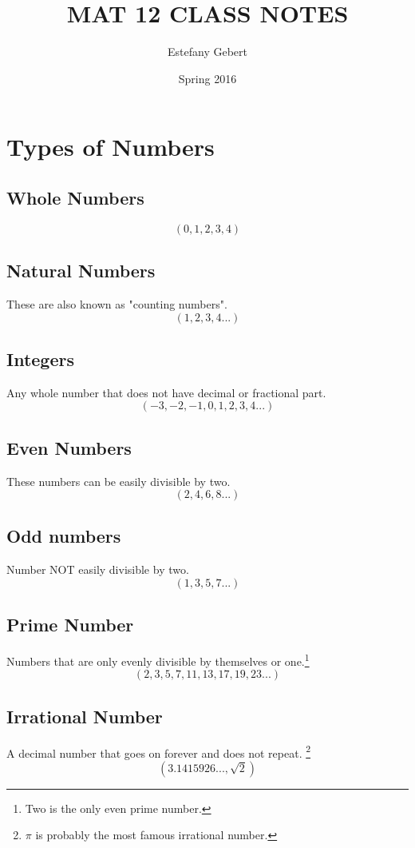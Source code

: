 \documentclass[]{article}
\title{MAT 12 CLASS NOTES}
\date{Spring 2016}
\author{Estefany Gebert}
\begin{document}
\maketitle

\tableofcontents
\pagebreak

\section{Types of Numbers}
\subsection{Whole Numbers}
$$ (0,1,2,3,4)$$

\subsection{Natural Numbers}
These are also known as "counting numbers". $$(1,2,3,4...)$$

\subsection{Integers}
Any whole number that does not have decimal or fractional part.
$$(-3,-2,-1,0,1,2,3,4...)$$

\subsection{Even Numbers}
These numbers can be easily divisible by two.
$$(2,4,6,8...)$$

\subsection{Odd numbers}
Number NOT easily divisible by two.
$$(1,3,5,7...)$$

\subsection{Prime Number}
Numbers that are only evenly divisible by themselves or one.\footnote{Two is the only even prime number.}
$$(2,3,5,7,11,13,17,19,23...)$$

\subsection{Irrational Number}
A decimal number that goes on forever and does not repeat. \footnote{$\pi$ is probably the most famous irrational number.}
$$(3.1415926..., \sqrt 2)$$
\end{document}
